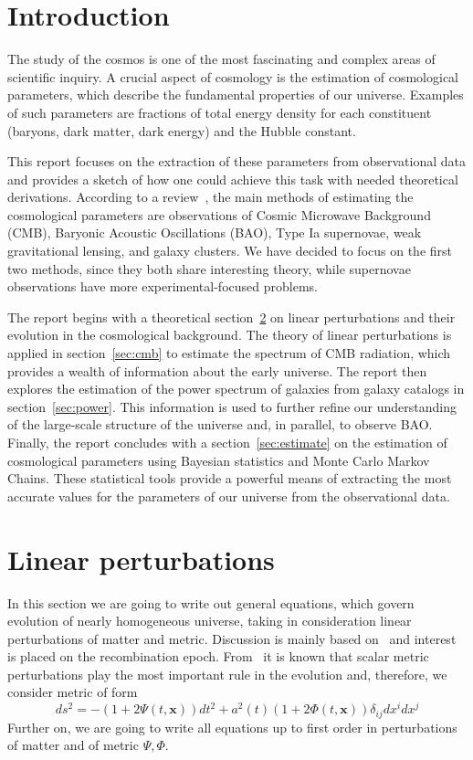 \documentclass[12pt]{extarticle}
\numberwithin{problem}{section}
\numberwithin{theorem}{section}
\begin{document}
	\section{Introduction}
	The study of the cosmos is one of the most fascinating and complex areas of scientific inquiry. A crucial aspect of cosmology is the estimation of cosmological parameters, which describe the fundamental properties of our universe. Examples of such parameters are fractions of total energy density for each constituent (baryons, dark matter, dark energy) and the Hubble constant. 
	
	This report focuses on the extraction of these parameters from observational data and provides a sketch of how one could achieve this task with needed theoretical derivations. According to a review~\cite{weinberg:2013}, the main methods of estimating the cosmological parameters are observations of Cosmic Microwave Background (CMB), Baryonic Acoustic Oscillations (BAO), Type Ia supernovae, weak gravitational lensing, and galaxy clusters. We have decided to focus on the first two methods, since they both share interesting theory, while supernovae observations have more experimental-focused problems.
	
	The report begins with a theoretical section~\ref{sec:linear} on linear perturbations and their evolution in the cosmological background. The theory of linear perturbations is applied in section~\ref{sec:cmb} to estimate the spectrum of CMB radiation, which provides a wealth of information about the early universe. The report then explores the estimation of the power spectrum of galaxies from galaxy catalogs in section~\ref{sec:power}. This information is used to further refine our understanding of the large-scale structure of the universe and, in parallel, to observe BAO. Finally, the report concludes with a section~\ref{sec:estimate} on the estimation of cosmological parameters using Bayesian statistics and Monte Carlo Markov Chains. These statistical tools provide a powerful means of extracting the most accurate values for the parameters of our universe from the observational data.
	
	\section{Linear perturbations}
	\label{sec:linear}
	In this section we are going to write out general equations, which govern evolution of nearly homogeneous universe, taking in consideration linear perturbations of matter and metric. Discussion is mainly based on~\cite{dodelson:2003} and interest is placed on the recombination epoch. From~\cite{gorbunov-rubakov-2:2011} it is known that scalar metric perturbations play the most important rule in the evolution and, therefore, we consider metric of form
	\begin{equation}
		\label{eq:perturb:metric}
		ds^2 = -(1 + 2\Psi(t, \mathbf{x}))dt^2 + a^2(t)(1 + 2\Phi(t, \mathbf{x}))\delta_{ij}dx^idx^j	
	\end{equation}
	Further on, we are going to write all equations up to first order in perturbations of matter and of metric $\Psi, \Phi$.
	
\end{document}
